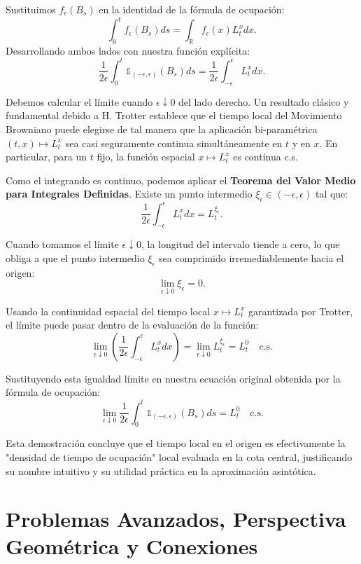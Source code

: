 \documentclass[11pt, letterpaper]{article}
\begin{document}
\begin{solucion}
    Sustituimos $f_\epsilon(B_s)$ en la identidad de la fórmula de ocupación:
    \[ \int_0^t f_\epsilon(B_s) ds = \int_{\mathbb{R}} f_\epsilon(x) L_t^x dx. \]
    Desarrollando ambos lados con nuestra función explícita:
    \[ \frac{1}{2\epsilon} \int_0^t \mathbb{1}_{(-\epsilon, \epsilon)}(B_s) ds = \frac{1}{2\epsilon} \int_{-\epsilon}^{\epsilon} L_t^x dx. \]

    Debemos calcular el límite cuando $\epsilon \downarrow 0$ del lado derecho.
    Un resultado clásico y fundamental debido a H. Trotter establece que el tiempo local del Movimiento Browniano puede elegirse de tal manera que la aplicación bi-paramétrica $(t, x) \mapsto L_t^x$ sea casi seguramente continua simultáneamente en $t$ y en $x$.
    En particular, para un $t$ fijo, la función espacial $x \mapsto L_t^x$ es continua c.s.

    Como el integrando es continuo, podemos aplicar el \textbf{Teorema del Valor Medio para Integrales Definidas}. Existe un punto intermedio $\xi_\epsilon \in (-\epsilon, \epsilon)$ tal que:
    \[ \frac{1}{2\epsilon} \int_{-\epsilon}^{\epsilon} L_t^x dx = L_t^{\xi_\epsilon}. \]

    Cuando tomamos el límite $\epsilon \downarrow 0$, la longitud del intervalo tiende a cero, lo que obliga a que el punto intermedio $\xi_\epsilon$ sea comprimido irremediablemente hacia el origen:
    \[ \lim_{\epsilon \downarrow 0} \xi_\epsilon = 0. \]
    
    Usando la continuidad espacial del tiempo local $x \mapsto L_t^x$ garantizada por Trotter, el límite puede pasar dentro de la evaluación de la función:
    \[ \lim_{\epsilon \downarrow 0} \left( \frac{1}{2\epsilon} \int_{-\epsilon}^{\epsilon} L_t^x dx \right) = \lim_{\epsilon \downarrow 0} L_t^{\xi_\epsilon} = L_t^0 \quad \text{c.s.} \]

    Sustituyendo esta igualdad límite en nuestra ecuación original obtenida por la fórmula de ocupación:
    \[ \lim_{\epsilon \downarrow 0} \frac{1}{2\epsilon} \int_0^t \mathbb{1}_{(-\epsilon, \epsilon)}(B_s) ds = L_t^0 \quad \text{c.s.} \]
    
    Esta demostración concluye que el tiempo local en el origen es efectivamente la "densidad de tiempo de ocupación" local evaluada en la cota central, justificando su nombre intuitivo y su utilidad práctica en la aproximación asintótica.
\end{solucion}

\newpage
\section{Problemas Avanzados, Perspectiva Geométrica y Conexiones}
\end{document}

